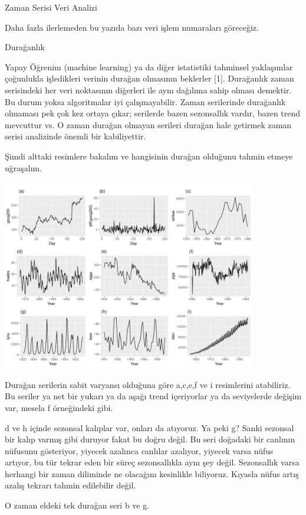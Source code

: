 \documentclass[12pt,fleqn]{article}\usepackage{../../common}
\begin{document}
Zaman Serisi Veri Analizi

Daha fazla ilerlemeden bu yazıda bazı veri işlem numaraları göreceğiz.

Durağanlık

Yapay Öğrenim (machine learning) ya da diğer istatistiki tahminsel yaklaşımlar
çoğunlukla işledikleri verinin durağan olmasının beklerler [1]. Durağanlık zaman
serisindeki her veri noktasının diğerleri ile aynı dağılıma sahip olması
demektir. Bu durum yoksa algoritmalar iyi çalışmayabilir. Zaman serilerinde
durağanlık olmaması pek çok kez ortaya çıkar; serilerde bazen sezonsallık
vardır, bazen trend mevcuttur vs. O zaman durağan olmayan serileri durağan hale
getirmek zaman serisi analizinde önemli bir kabiliyettir.

Şimdi alttaki resimlere bakalım ve hangisinin durağan olduğunu tahmin etmeye
uğraşalım. 

\includegraphics[width=30em]{tser_008_data_01.png}

Durağan serilerin sabit varyansı olduğuna göre a,c,e,f ve i resimlerini
atabiliriz. Bu seriler ya net bir yukarı ya da aşağı trend içeriyorlar ya
da seviyelerde değişim var, mesela f örneğindeki gibi.

d ve h içinde sezonsal kalıplar var, onları da atıyoruz. Ya peki g?  Sanki
sezonsal bir kalıp varmış gibi duruyor fakat bu doğru değil. Bu seri doğadaki
bir canlının nüfusunu gösteriyor, yiyecek azalınca canlılar azalıyor, yiyecek
varsa nüfus artıyor, bu tür tekrar eden bir süreç sezonsallıkla aynı şey
değil. Sezonsallık varsa herhangi bir zaman diliminde ne olacağını kesinlikle
biliyoruz. Kıyasla nüfus artış azalış tekrarı tahmin edilebilir değil.

O zaman eldeki tek durağan seri b ve g.
\end{document}
